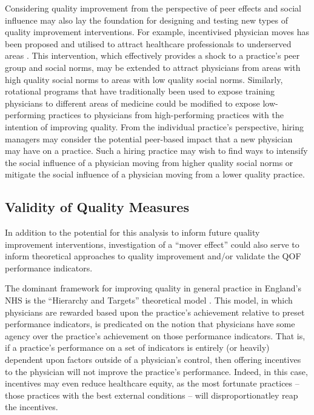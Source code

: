 \documentclass[12pt]{article}
\begin{document}
Considering quality improvement from the perspective of peer effects and social influence may also lay the foundation for designing and testing new types of quality improvement interventions. For example, incentivised physician moves has been proposed \citep{liRetainingRuralDoctors2014} and utilised \citep{yongRuralIncentivesPayments2018a} to attract healthcare professionals to underserved areas \citep{doleaEvaluatedStrategiesIncrease2010}. This intervention, which effectively provides a shock to a practice's peer group and social norms, may be extended to attract physicians from areas with high quality social norms to areas with low quality social norms. Similarly, rotational programs that have traditionally been used to expose training physicians to different areas of medicine \citep{bell-dzideEffectLongtermCare2014} could be modified to expose low-performing practices to physicians from high-performing practices with the intention of improving quality. From the individual practice's perspective, hiring managers may consider the potential peer-based impact that a new physician may have on a practice. Such a hiring practice may wish to find ways to intensify the social influence of a physician moving from higher quality social norms or mitigate the social influence of a physician moving from a lower quality practice.



\subsection{Validity of Quality Measures}

In addition to the potential for this analysis to inform future quality improvement interventions, investigation of a ``mover effect'' could also serve to inform theoretical approaches to quality improvement and/or validate the QOF performance indicators.

The dominant framework for improving quality in general practice in England's NHS is the ``Hierarchy and Targets'' theoretical model \citep{bevanModelsGovernancePublic2013}. This model, in which physicians are rewarded based upon the practice's achievement relative to preset performance indicators, is predicated on the notion that physicians have some agency over the practice's achievement on those performance indicators. That is, if a practice's performance on a set of indicators is entirely (or heavily) dependent upon factors outside of a physician's control, then offering incentives to the physician will not improve the practice's performance. Indeed, in this case, incentives may even reduce healthcare equity, as the most fortunate practices -- those practices with the best external conditions -- will disproportionatley reap the incentives.
\end{document}
